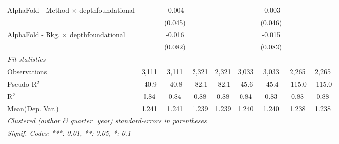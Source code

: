 \begin{tabular}{lcccccccc}
   AlphaFold - Method $\times$ depthfoundational  &             & -0.004  &       &       &             & -0.003  &        &   \\   
                                                  &             & (0.045) &       &       &             & (0.046) &        &   \\   
   AlphaFold - Bkg. $\times$ depthfoundational    &             & -0.016  &       &       &             & -0.015  &        &   \\   
                                                  &             & (0.082) &       &       &             & (0.083) &        &   \\   
   \midrule
   \emph{Fit statistics}\\
   Observations                                   & 3,111       & 3,111   & 2,321 & 2,321 & 3,033       & 3,033   & 2,265  & 2,265\\  
   Pseudo R$^2$                                   & -40.9       & -40.8   & -82.1 & -82.1 & -45.6       & -45.4   & -115.0 & -115.0\\  
   R$^2$                                          & 0.84        & 0.84    & 0.88  & 0.88  & 0.84        & 0.83    & 0.88   & 0.88\\  
Mean(Dep. Var.) & 1.241 & 1.241 & 1.239 & 1.239 & 1.240 & 1.240 & 1.238 & 1.238 \\
   \midrule \midrule
   \multicolumn{9}{l}{\emph{Clustered (author \& quarter\_year) standard-errors in parentheses}}\\
   \multicolumn{9}{l}{\emph{Signif. Codes: ***: 0.01, **: 0.05, *: 0.1}}\\
\end{tabular}
\par\endgroup
